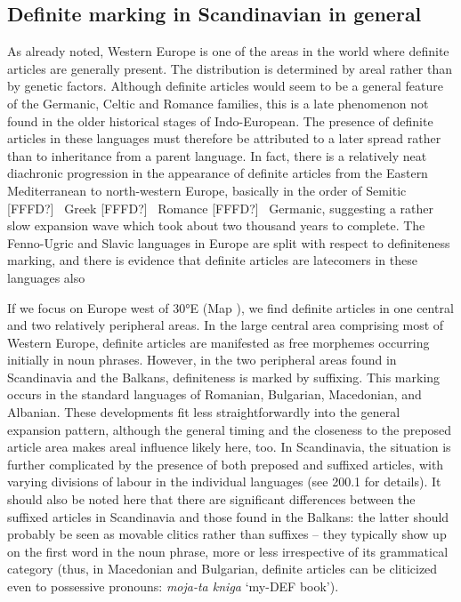\subsection{\rmfamily Definite marking in Scandinavian in general}
\label{bkm:Ref224380083}
\begin{styleBodyTextFirst}
As already noted, Western Europe is one of the areas in the world where definite articles are generally present. The distribution is determined by areal rather than by genetic factors. Although definite articles would seem to be a general feature of the Germanic, Celtic and Romance families, this is a late phenomenon not found in the older historical stages of Indo-European. The presence of definite articles in these languages must therefore be attributed to a later spread rather than to inheritance from a parent language. In fact, there is a relatively neat diachronic progression in the appearance of definite articles from the Eastern Mediterranean to north-western Europe, basically in the order of Semitic [FFFD?]~ Greek [FFFD?]~ Romance [FFFD?]~ Germanic, suggesting a rather slow expansion wave which took about two thousand years to complete. The Fenno-Ugric and Slavic languages in Europe are split with respect to definiteness marking, and there is evidence that definite articles are latecomers in these languages also

\end{styleBodyTextFirst}

\begin{styleBodytextC}
If we focus on Europe west of 30°E (Map ), we find definite articles in one central and two relatively peripheral areas. In the large central area comprising most of Western Europe, definite articles are manifested as free morphemes occurring initially in noun phrases. However, in the two peripheral areas found in Scandinavia and the Balkans, definiteness is marked by suffixing.  This marking occurs in the standard languages of Romanian, Bulgarian, Macedonian, and Albanian. These developments fit less straightforwardly into the general expansion pattern, although the general timing and the closeness to the preposed article area makes areal influence likely here, too. In Scandinavia, the situation is further complicated by the presence of both preposed and suffixed articles, with varying divisions of labour in the individual languages (see 200.1 for details). It should also be noted here that there are significant differences between the suffixed articles in Scandinavia and those found in the Balkans: the latter should probably be seen as movable clitics rather than suffixes – they typically show up on the first word in the noun phrase, more or less irrespective of its grammatical category (thus, in Macedonian and Bulgarian, definite articles can be cliticized even to possessive pronouns: \textit{moja-ta kniga} ‘my-DEF book’). 

\end{styleBodytextC}

